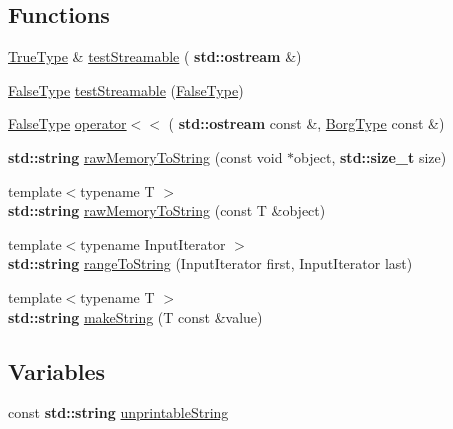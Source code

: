 \subsection*{Functions}
\begin{DoxyCompactItemize}
\item 
\hyperlink{struct_catch_1_1_detail_1_1_true_type}{True\+Type} \& \hyperlink{namespace_catch_1_1_detail_aff0ca0f561ad8053654ab27d54486197}{test\+Streamable} (\textbf{ std\+::ostream} \&)
\item 
\hyperlink{struct_catch_1_1_detail_1_1_false_type}{False\+Type} \hyperlink{namespace_catch_1_1_detail_aac81f01b0d687f75b8f24a925591b7ac}{test\+Streamable} (\hyperlink{struct_catch_1_1_detail_1_1_false_type}{False\+Type})
\item 
\hyperlink{struct_catch_1_1_detail_1_1_false_type}{False\+Type} \hyperlink{namespace_catch_1_1_detail_ae9a44d574c4fbd18fabaaee05a433d88}{operator$<$$<$} (\textbf{ std\+::ostream} const \&, \hyperlink{struct_catch_1_1_detail_1_1_borg_type}{Borg\+Type} const \&)
\item 
\textbf{ std\+::string} \hyperlink{namespace_catch_1_1_detail_ac5d6c510e565ee5bddcc2236194ce29e}{raw\+Memory\+To\+String} (const void $\ast$object, \textbf{ std\+::size\+\_\+t} size)
\item 
{\footnotesize template$<$typename T $>$ }\\\textbf{ std\+::string} \hyperlink{namespace_catch_1_1_detail_a371620ed524abfcae5c3772bf49b563a}{raw\+Memory\+To\+String} (const T \&object)
\item 
{\footnotesize template$<$typename Input\+Iterator $>$ }\\\textbf{ std\+::string} \hyperlink{namespace_catch_1_1_detail_a6650a1dff325bf29962ff15ae73fd972}{range\+To\+String} (Input\+Iterator first, Input\+Iterator last)
\item 
{\footnotesize template$<$typename T $>$ }\\\textbf{ std\+::string} \hyperlink{namespace_catch_1_1_detail_aef46b4178e08758524d25d1d969a503c}{make\+String} (T const \&value)
\end{DoxyCompactItemize}
\subsection*{Variables}
\begin{DoxyCompactItemize}
\item 
const \textbf{ std\+::string} \hyperlink{namespace_catch_1_1_detail_a466775f4eec29ffef29ab334cd885136}{unprintable\+String}
\end{DoxyCompactItemize}


